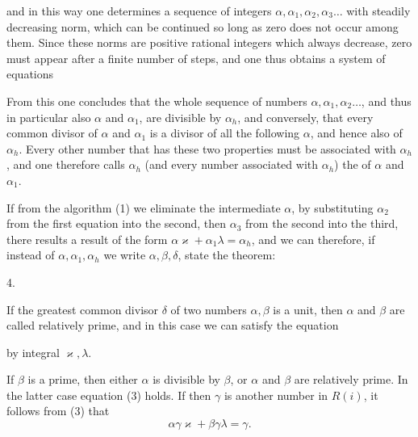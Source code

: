 and in this way one determines a sequence of integers $\alpha, \alpha_1, \alpha_2, \alpha_3 \dots$
with steadily decreasing norm, which can be continued so long
as zero does not occur among them. Since these norms are positive
rational integers which always decrease, zero must appear
after a finite number of steps, and one thus obtains
a system of equations


From this one concludes that the whole sequence of numbers
$\alpha, \alpha_1, \alpha_2 \dots$, and thus in particular also $\alpha$ and $\alpha_1$, are divisible
by $\alpha_h$, and conversely, that every common divisor of $\alpha$
and $\alpha_1$ is a divisor of all the following $\alpha$, and hence also of $\alpha_h$.
Every other number that has these two properties must
be associated with $\alpha_h$, and one therefore calls $\alpha_h$ (and every number
associated with $\alpha_h$) the  of
$\alpha$ and $\alpha_1$.

If from the algorithm (1) we eliminate the intermediate $\alpha$,
by substituting $\alpha_2$ from the first equation into the second, then $\alpha_3$
from the second into the third, there results
a result of the form $\alpha\varkappa + \alpha_1\lambda = \alpha_h$, and we can
therefore, if instead of $\alpha, \alpha_1, \alpha_h$ we write $\alpha, \beta, \delta$, state the theorem:

4. 


If the greatest common divisor $\delta$ of two numbers
$\alpha, \beta$ is a unit, then $\alpha$ and $\beta$ are called relatively prime, and in this
case we can satisfy the equation

by integral $\varkappa, \lambda$.

If $\beta$ is a prime, then either $\alpha$ is divisible by $\beta$,
or $\alpha$ and $\beta$ are relatively prime. In the latter case
equation (3) holds. If then $\gamma$ is another number in $R(i)$, it follows from (3) that
\[
\alpha\gamma\varkappa + \beta\gamma\lambda = \gamma.
\]
